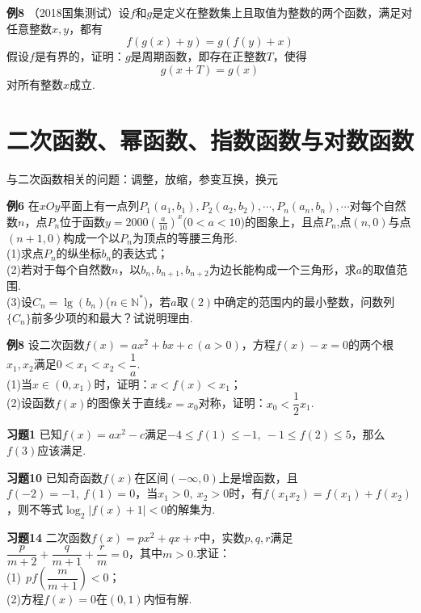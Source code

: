 \documentclass[lang=cn, zihao=4.5]{elegantbook}
\newcommand{\tk}{\uline{\hspace{4em}}}
\newcommand{\ssb}[1]{\left( #1 \right)}
\begin{document}
\newpage
\noindent %
	\textbf{例8} \quad （2018国集测试）设$f$和$g$是定义在整数集上且取值为整数的两个函数，满足对任意整数$x,y$，都有$$f(g(x)+y)=g(f(y)+x)$$
	假设$f$是有界的，证明：$g$是周期函数，即存在正整数$T$，使得$$g(x+T)=g(x)$$
	对所有整数$x$成立.
	
\newpage
\section{二次函数、幂函数、指数函数与对数函数}

与二次函数相关的问题：调整，放缩，参变互换，换元

\noindent %
	\textbf{例6} \quad 在$xOy$平面上有一点列$P_1(a_1,b_1),P_2(a_2,b_2),\cdots,P_n(a_n,b_n),\cdots$对每个自然数$n$，点$P_n$位于函数$y=2000\ssb{\frac{a}{10}}^x$($0<a<10$)的图象上，且点$P_n$,点$(n,0)$与点$(n+1,0)$构成一个以$P_n$为顶点的等腰三角形. \\
	(1)求点$P_n$的纵坐标$b_n$的表达式；\\
	(2)若对于每个自然数$n$，以$b_n,b_{n+1},b_{n+2}$为边长能构成一个三角形，求$a$的取值范围.\\
	(3)设$C_n=\lg (b_n)$($n \in \mathbb{N}^*$)，若$a$取$(2)$中确定的范围内的最小整数，问数列$\{ C_n \}$前多少项的和最大？试说明理由.

\vspace{28em}
\noindent %
	\textbf{例8} \quad 设二次函数$f(x)=ax^2+bx+c~(a>0)$，方程$f(x)-x=0$的两个根$x_1,x_2$满足$0<x_1<x_2< \dfrac{1}{a}$. \\
	(1)当$x \in (0,x_1)$时，证明：$x<f(x)<x_1$； \\
	(2)设函数$f(x)$的图像关于直线$x=x_0$对称，证明：$x_0 < \dfrac{1}{2}x_1$.

\newpage
\noindent %
	\textbf{习题1} \quad 已知$f(x)=ax^2-c$满足$-4 \leq f(1) \leq -1,~ -1 \leq f(2) \leq 5$，那么$f(3)$应该满足\tk .

\vspace{30em}
\noindent %
	\textbf{习题10} \quad 已知奇函数$f(x)$在区间$(-\infty ,0)$上是增函数，且$f(-2)=-1,~f(1)=0$，当$x_1>0,~ x_2>0$时，有$f(x_1x_2)=f(x_1)+f(x_2)$，则不等式$\log_{2}{|f(x)+1|}<0$的解集为\tk .
	
\newpage
\noindent %
	\textbf{习题14} \quad 二次函数$f(x)=px^2+qx+r$中，实数$p,q,r$满足$\dfrac{p}{m+2}+\dfrac{q}{m+1}+\dfrac{r}{m}=0$，其中$m>0$.求证： \\
	(1)$~~pf \ssb{\dfrac{m}{m+1}} < 0$； \\
	(2)方程$f(x)=0$在$(0,1)$内恒有解.
	
\end{document}
